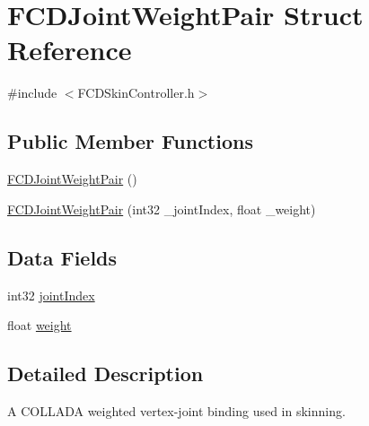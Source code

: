 \hypertarget{structFCDJointWeightPair}{
\section{FCDJointWeightPair Struct Reference}
\label{structFCDJointWeightPair}
}


{\ttfamily \#include $<$FCDSkinController.h$>$}

\subsection*{Public Member Functions}
\begin{DoxyCompactItemize}
\item 
\hyperlink{structFCDJointWeightPair_adb720c80d8fde84e5fdecf16f9b6de8a}{FCDJointWeightPair} ()
\item 
\hyperlink{structFCDJointWeightPair_a3c34c929311b6d2b555f91c18c230090}{FCDJointWeightPair} (int32 \_\-jointIndex, float \_\-weight)
\end{DoxyCompactItemize}
\subsection*{Data Fields}
\begin{DoxyCompactItemize}
\item 
int32 \hyperlink{structFCDJointWeightPair_a12f6483d8748e4cca1089064b1934a3b}{jointIndex}
\item 
float \hyperlink{structFCDJointWeightPair_a375a6320fef00a704bbdaf67097f8552}{weight}
\end{DoxyCompactItemize}


\subsection{Detailed Description}
A COLLADA weighted vertex-\/joint binding used in skinning. 

